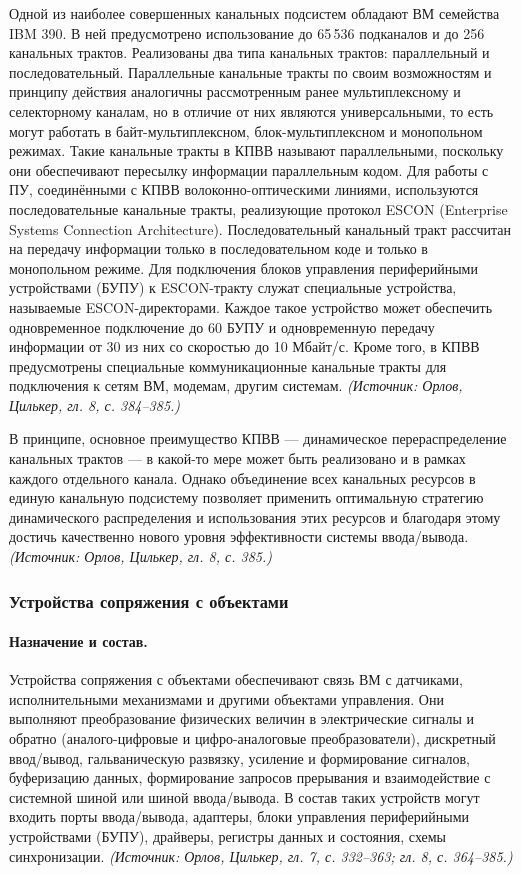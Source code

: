 \documentclass[a4paper,12pt]{article}
\begin{document}
Одной из наиболее совершенных канальных подсистем обладают ВМ семейства IBM 390. В ней предусмотрено использование до 65\,536 подканалов и до 256 канальных трактов. Реализованы два типа канальных трактов: параллельный и последовательный. Параллельные канальные тракты по своим возможностям и принципу действия аналогичны рассмотренным ранее мультиплексному и селекторному каналам, но в отличие от них являются универсальными, то есть могут работать в байт-мультиплексном, блок-мультиплексном и монопольном режимах. Такие канальные тракты в КПВВ называют параллельными, поскольку они обеспечивают пересылку информации параллельным кодом. Для работы с ПУ, соединёнными с КПВВ волоконно-оптическими линиями, используются последовательные канальные тракты, реализующие протокол ESCON (Enterprise Systems Connection Architecture). Последовательный канальный тракт рассчитан на передачу информации только в последовательном коде и только в монопольном режиме. Для подключения блоков управления периферийными устройствами (БУПУ) к ESCON-тракту служат специальные устройства, называемые ESCON-директорами. Каждое такое устройство может обеспечить одновременное подключение до 60 БУПУ и одновременную передачу информации от 30 из них со скоростью до 10 Мбайт/с. Кроме того, в КПВВ предусмотрены специальные коммуникационные канальные тракты для подключения к сетям ВМ, модемам, другим системам.
\textit{(Источник: Орлов, Цилькер, гл. 8, с. 384--385.)}

В принципе, основное преимущество КПВВ — динамическое перераспределение канальных трактов — в какой-то мере может быть реализовано и в рамках каждого отдельного канала. Однако объединение всех канальных ресурсов в единую канальную подсистему позволяет применить оптимальную стратегию динамического распределения и использования этих ресурсов и благодаря этому достичь качественно нового уровня эффективности системы ввода/вывода.
\textit{(Источник: Орлов, Цилькер, гл. 8, с. 385.)}

\subsubsection{Устройства сопряжения с объектами}

\paragraph{Назначение и состав.}
Устройства сопряжения с объектами обеспечивают связь ВМ с датчиками, исполнительными механизмами и другими объектами управления. Они выполняют преобразование физических величин в электрические сигналы и обратно (аналого-цифровые и цифро-аналоговые преобразователи), дискретный ввод/вывод, гальваническую развязку, усиление и формирование сигналов, буферизацию данных, формирование запросов прерывания и взаимодействие с системной шиной или шиной ввода/вывода. В состав таких устройств могут входить порты ввода/вывода, адаптеры, блоки управления периферийными устройствами (БУПУ), драйверы, регистры данных и состояния, схемы синхронизации.
\textit{(Источник: Орлов, Цилькер, гл. 7, с. 332--363; гл. 8, с. 364--385.)}
\end{document}
